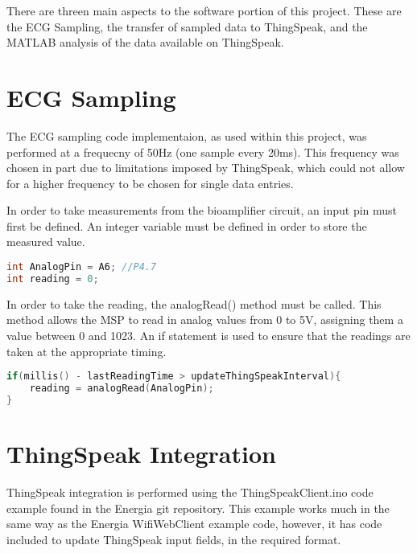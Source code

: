 \documentclass[11pt,a4paper,headinclude=false,footinclude=false]{scrreprt}
\begin{document}
There are threen main aspects to the software portion of this project.
These are the ECG Sampling, the transfer of sampled data to ThingSpeak,
and the MATLAB analysis of the data available on ThingSpeak.

\hypertarget{ecg-sampling}{%
\section{ECG Sampling}\label{ecg-sampling}}

The ECG sampling code implementaion, as used within this project, was
performed at a frequecny of 50Hz (one sample every 20ms). This frequency
was chosen in part due to limitations imposed by ThingSpeak, which could
not allow for a higher frequency to be chosen for single data entries.

In order to take measurements from the bioamplifier circuit, an input
pin must first be defined. An integer variable must be defined in order
to store the measured value.

\lstset{
    caption=Analog Input Pin Definition,
    basicstyle=\footnotesize, frame=tb,
    xleftmargin=.2\textwidth, xrightmargin=.2\textwidth
}
\begin{lstlisting}[language=C]
int AnalogPin = A6; //P4.7
int reading = 0;
\end{lstlisting}

In order to take the reading, the analogRead() method must be called.
This method allows the MSP to read in analog values from 0 to 5V,
assigning them a value between 0 and 1023. An if statement is used to
ensure that the readings are taken at the appropriate timing.

\lstset{
    caption=Analog Read,
    basicstyle=\footnotesize, frame=tb,
    xleftmargin=.1\textwidth, xrightmargin=.1\textwidth
}
\begin{lstlisting}[language=C]
if(millis() - lastReadingTime > updateThingSpeakInterval){
    reading = analogRead(AnalogPin);
}
\end{lstlisting}

\hypertarget{thingspeak-integration}{%
\section{ThingSpeak Integration}\label{thingspeak-integration}}

ThingSpeak integration is performed using the ThingSpeakClient.ino code
example found in the Energia git repository\cite{thingino}. This example
works much in the same way as the Energia WifiWebClient example code,
however, it has code included to update ThingSpeak input fields, in the
required format.
\end{document}
